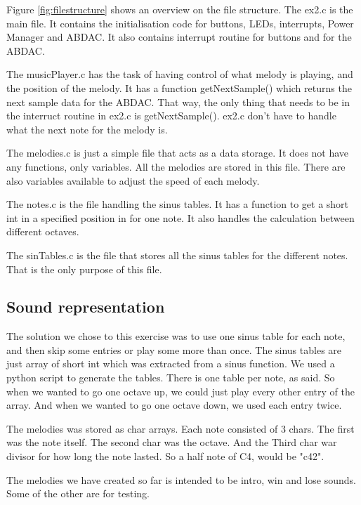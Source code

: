 \documentclass[12pt,a4paper,final]{report}
\numberwithin{equation}{section}
\numberwithin{table}{section}
\numberwithin{figure}{section}
\begin{document}
Figure \ref{fig:filestructure} shows an overview on the file structure. The ex2.c is the main file. It contains the initialisation code for buttons, LEDs, interrupts, Power Manager and ABDAC. It also contains interrupt routine for buttons and for the ABDAC.

The musicPlayer.c has the task of having control of what melody is playing, and the position of the melody. It has a function getNextSample() which returns the next sample data for the ABDAC. That way, the only thing that needs to be in the interruct routine in ex2.c is getNextSample(). ex2.c don't have to handle what the next note for the melody is.

The melodies.c is just a simple file that acts as a data storage. It does not have any functions, only variables. All the melodies are stored in this file. There are also variables available to adjust the speed of each melody.

The notes.c is the file handling the sinus tables. It has a function to get a short int in a specified position in for one note. It also handles the calculation between different octaves.

The sinTables.c is the file that stores all the sinus tables for the different notes. That is the only purpose of this file.


\subsection{Sound representation}
\label{sec:soundrepresentation}

The solution we chose to this exercise was to use one sinus table for each note, and then skip some entries or play some more than once. The sinus tables are just array of short int which was extracted from a sinus function. We used a python script to generate the tables. There is one table per note, as said. So when we wanted to go one octave up, we could just play every other entry of the array. And when we wanted to go one octave down, we used each entry twice. 

The melodies was stored as char arrays. Each note consisted of 3 chars. The first was the note itself. The second char was the octave. And the Third char war divisor for how long the note lasted. So a half note of C4, would be "c42".

The melodies we have created so far is intended to be intro, win and lose sounds. Some of the other are for testing.


\newpage
\end{document}
